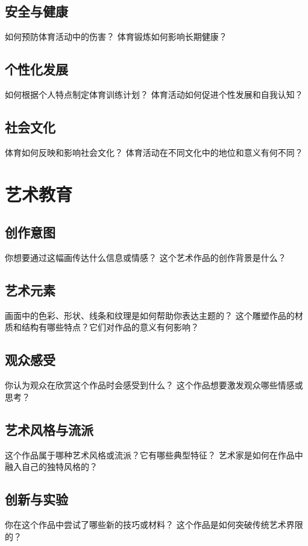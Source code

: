 \documentclass[12pt]{book}
\begin{document}
\subsection{安全与健康}
如何预防体育活动中的伤害？
体育锻炼如何影响长期健康？

\subsection{个性化发展}
如何根据个人特点制定体育训练计划？
体育活动如何促进个性发展和自我认知？

\subsection{社会文化}
体育如何反映和影响社会文化？
体育活动在不同文化中的地位和意义有何不同？


\section{艺术教育}
\subsection{创作意图}
你想要通过这幅画传达什么信息或情感？
这个艺术作品的创作背景是什么？

\subsection{艺术元素}
画面中的色彩、形状、线条和纹理是如何帮助你表达主题的？
这个雕塑作品的材质和结构有哪些特点？它们对作品的意义有何影响？

\subsection{观众感受}
你认为观众在欣赏这个作品时会感受到什么？
这个作品想要激发观众哪些情感或思考？

\subsection{艺术风格与流派}
这个作品属于哪种艺术风格或流派？它有哪些典型特征？
艺术家是如何在作品中融入自己的独特风格的？

\subsection{创新与实验}
你在这个作品中尝试了哪些新的技巧或材料？
这个作品是如何突破传统艺术界限的？
\end{document}
